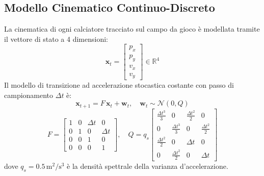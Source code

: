 \documentclass[11pt,a4paper]{article}
\begin{document}
\subsection{Modello Cinematico Continuo-Discreto}
La cinematica di ogni calciatore tracciato sul campo da gioco è modellata tramite il vettore di stato a 4 dimensioni:
\begin{equation}
\mathbf{x}_t = \begin{bmatrix} p_x \\ p_y \\ v_x \\ v_y \end{bmatrix} \in \mathbb{R}^4
\end{equation}
Il modello di transizione ad accelerazione stocastica costante con passo di campionamento $\Delta t$ è:
\begin{equation}
\mathbf{x}_{t+1} = F \, \mathbf{x}_t + \mathbf{w}_t, \quad \mathbf{w}_t \sim \mathcal{N}(0, Q)
\end{equation}
\begin{equation}
F = \begin{bmatrix} 1 & 0 & \Delta t & 0 \\ 0 & 1 & 0 & \Delta t \\ 0 & 0 & 1 & 0 \\ 0 & 0 & 0 & 1 \end{bmatrix}, \quad Q = q_s \begin{bmatrix}
\frac{\Delta t^3}{3} & 0 & \frac{\Delta t^2}{2} & 0 \\
0 & \frac{\Delta t^3}{3} & 0 & \frac{\Delta t^2}{2} \\
\frac{\Delta t^2}{2} & 0 & \Delta t & 0 \\
0 & \frac{\Delta t^2}{2} & 0 & \Delta t
\end{bmatrix}
\end{equation}
dove $q_s = 0.5\,\text{m}^2/\text{s}^3$ è la densità spettrale della varianza d'accelerazione.
\end{document}
